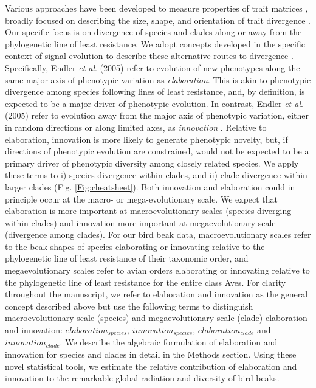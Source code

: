\documentclass[12pt,letterpaper]{article}
\begin{document}
Various approaches have been developed to measure properties of trait matrices \cite{hansen2008measuring, pavlicev2009measuring, watanabe2022}, broadly focused on describing the size, shape, and orientation of trait divergence \cite{phillips1999}.
Our specific focus is on divergence of species and clades along or away from the phylogenetic line of least resistance.
We adopt concepts developed in the specific context of signal evolution to describe these alternative routes to divergence \cite{endler2005animal}.
Specifically, Endler \textit{et al}. (2005) refer to evolution of new phenotypes along the same major axis of phenotypic variation as \textit{elaboration}.
This is akin to phenotypic divergence among species following lines of least resistance, and, by definition, is expected to be a major driver of phenotypic evolution.
In contrast, Endler \textit{et al}. (2005) refer to evolution away from the major axis of phenotypic variation, either in random directions or along limited axes, as \textit{innovation} \cite{endler2005animal}.
Relative to elaboration, innovation is more likely to generate phenotypic novelty, but, if directions of phenotypic evolution are constrained, would not be expected to be a primary driver of phenotypic diversity among closely related species.
We apply these terms to i) species divergence within clades, and ii) clade divergence within larger clades (Fig. \ref{Fig:cheatsheet}).
Both innovation and elaboration could in principle occur at the macro- or mega-evolutionary scale.
We expect that elaboration is more important at macroevolutionary scales (species diverging within clades) and innovation more important at megaevolutionary scale (divergence among clades).
For our bird beak data, macroevolutionary scales refer to the beak shapes of species elaborating or innovating relative to the phylogenetic line of least resistance of their taxonomic order, and megaevolutionary scales refer to avian orders elaborating or innovating relative to the phylogenetic line of least resistance for the entire class Aves.
For clarity throughout the manuscript, we refer to elaboration and innovation as the general concept described above but use the following terms to distinguish macroevolutionary scale (species) and megaevolutionary scale (clade) elaboration and innovation: $elaboration_{species}$, $innovation_{species}$, $elaboration_{clade}$ and $innovation_{clade}$.
We describe the algebraic formulation of elaboration and innovation for species and clades in detail in the Methods section.
Using these novel statistical tools, we estimate the relative contribution of elaboration and innovation to the remarkable global radiation and diversity of bird beaks.
\end{document}
